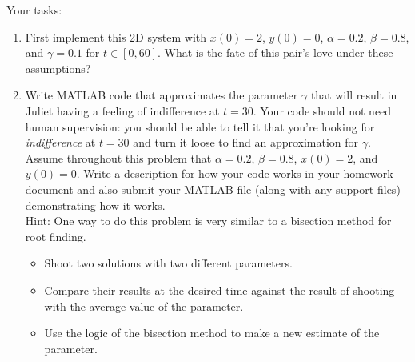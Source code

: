 \begin{problem}
    Your tasks:
    \begin{enumerate}
        \item First implement this 2D system with $x(0) = 2$, $y(0)=0$, $\alpha=0.2$,
            $\beta=0.8$, and $\gamma=0.1$ for $t \in [0,60]$.  What is the fate of this
            pair's love under these assumptions?
        \item Write MATLAB code that approximates the parameter $\gamma$ that will result
            in Juliet having a feeling of indifference at $t=30$.  Your code should not
            need human supervision: you should be able to tell it that you're looking for
            {\it indifference} at $t=30$ and turn it loose to find an approximation for
            $\gamma$.  Assume throughout this problem that $\alpha=0.2$, $\beta=0.8$,
            $x(0)=2$, and $y(0)=0$. Write a description for how your code works in your
            homework document and also submit your MATLAB file (along with any support
            files) demonstrating how it works.
            \\
            Hint: One way to do this problem is very similar to a bisection method for
            root finding. 
            \begin{itemize}
                \item Shoot two solutions with two different parameters.
                \item Compare their results at the desired time against the result of
                    shooting with the average value of the parameter.
                \item Use the logic of the bisection method to make a new estimate of the
                    parameter.
            \end{itemize}
    \end{enumerate}
\end{problem}

